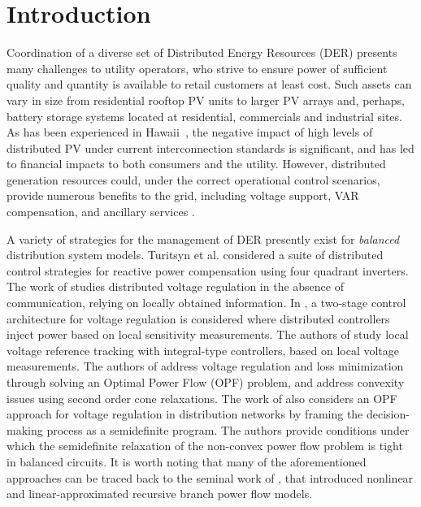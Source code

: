 \section{Introduction}

Coordination of a diverse set of Distributed Energy Resources (DER) presents many challenges to utility operators, who strive to ensure power of sufficient quality and quantity is available to retail customers at least cost.  Such assets can vary in size from residential rooftop PV units to larger PV arrays and, perhaps, battery storage systems located at residential, commercials and industrial sites.  As has been experienced in Hawaii~\cite{stewart2013analysis}, the negative impact of high levels of distributed PV under current interconnection standards is significant, and has led to financial impacts to both consumers and the utility.  However, distributed generation resources could, under the correct operational control scenarios, provide numerous benefits to the grid, including voltage support, VAR compensation, and ancillary services \cite{doe2015ADMS}.  

A variety of strategies for the management of DER presently exist for \emph{balanced} distribution system models.  Turitsyn et al. \cite{turitsyn2011options} considered a suite of distributed control strategies for reactive power compensation using four quadrant inverters.  The work of \cite{li2014real} studies distributed voltage regulation in the absence of communication, relying on locally obtained information.  In \cite{robbins2013two}, a two-stage control architecture for voltage regulation is considered where distributed controllers inject power based on local sensitivity measurements.  The authors of \cite{zhang2013local} study local voltage reference tracking with integral-type controllers, based on local voltage measurements.  The authors of \cite{farivar2011inverter} address voltage regulation and loss minimization through solving an Optimal Power Flow (OPF) problem, and address convexity issues using second order cone relaxations.  The work of \cite{lam2012optimal} also considers an OPF approach for voltage regulation in distribution networks by framing the decision-making process as a semidefinite program.  The authors provide conditions under which the semidefinite relaxation of the non-convex power flow problem is tight in balanced circuits. It is worth noting that many of the aforementioned approaches can be traced back to the seminal work of \cite{baran1989optimal}, that introduced nonlinear and linear-approximated recursive branch power flow models.

